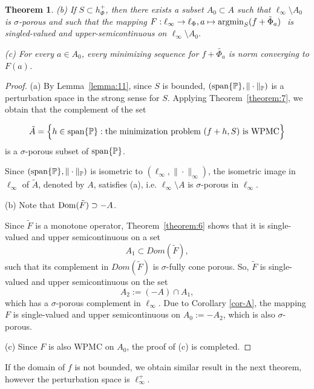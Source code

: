 \documentclass[12pt]{article}
\theoremstyle{thmstyleone}%
\newtheorem{theorem}{Theorem}
\theoremstyle{thmstyletwo}%
\theoremstyle{thmstylethree}%
\begin{document}
{{{{\begin{theorem}
(b) If $S\subset h_{\Phi}^{+}$, then 	
there  exists a  subset $A_0\subset A$ such that $\ell_\infty\setminus A_0$ is $  \sigma$-porous and such that
  the mapping $F: \ell_\infty \rightarrow \ell_\Phi, a\mapsto {\rm argmin}_{S}(f+\tilde \Phi_a) \ 
		$  is singled-valued and upper-semicontinuous on $\ell_\infty\setminus A_0$.
		
		(c) For every $a\in A_0$, every minimizing sequence for $f+\widetilde{\Phi_a}$ is norm converging to $F(a)$. 
 	
\end{theorem}

 
\begin{proof}

(a) 
By Lemma~\ref{lemma:11}, since $S$ is bounded, 
$({\rm span}\{\mathbb{P}\},\|\cdot\|_{\mathbb{P}})$ is a perturbation space in the strong sense for $S$.
Applying Theorem~\ref{theorem:7}, we obtain that the complement of the set


\[
\tilde A=\Bigl\{
   h\in {\rm span}\{\mathbb{P}\} :
   \text{the minimization problem } (f+h,S) \text{ is WPMC}
\Bigr\}
\]
 is a $\sigma$-porous subset of ${\rm span}\{\mathbb{P}\}$.

Since $({\rm span}\{\mathbb{P}\},\|\cdot\|_{\mathbb{P}})$ is isometric to 
$(\ell_\infty,\|\cdot\|_\infty)$, the isometric image in $\ell_\infty$ of $\tilde A$, denoted by $A$,  satisfies (a), i.e. $\ell_\infty \setminus A$ is $\sigma$-porous in $\ell_\infty$.

(b)  
{
Note that 
${\rm Dom}(\tilde F) \supset -A$.}

  
Since $\tilde F $ is a monotone operator,  Theorem~\ref{theorem:6} shows that it is single-valued and upper semicontinuous on a set
\[
A_1 \subset Dom(\tilde F),
\]
such that its complement in $Dom(\tilde F)$ 
is $\sigma$-fully cone porous. So, $\tilde F$ is single-valued and upper semicontinuous on the set 
$$
A_2:=(-A)\cap A_1, 
$$
which has a $\sigma$-porous complement in $\ell_\infty$. 
Due to Corollary \ref{cor-A}, the mapping  $F$ is single-valued and upper semicontinuous on $A_0:=-A_2$, which is also $\sigma$-porous.  

(c)  Since $F$ is also WPMC on $A_0$, the proof of (c) is completed.   

\end{proof}
  
 If the domain of $f$ is not bounded, we obtain similar result in the next theorem,
however the perturbation space is $\ell_\infty^+$.

}}}}
\end{document}
